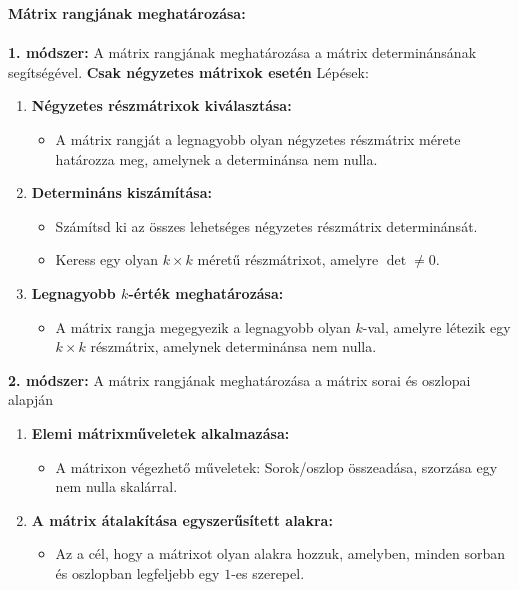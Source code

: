 \documentclass[a4paper, 12pt]{scrartcl}
\begin{document}
\begin{blueBox}
  \textbf{\large Mátrix rangjának meghatározása:}\\
  \,\\
  \textbf{1. módszer:} A mátrix rangjának meghatározása a mátrix determinánsának segítségével. \textbf{Csak négyzetes mátrixok esetén} Lépések:
  \begin{enumerate}
    \item \textbf{Négyzetes részmátrixok kiválasztása:}
          \begin{itemize}
            \item A mátrix rangját a legnagyobb olyan négyzetes részmátrix mérete határozza meg, amelynek a determinánsa nem nulla.
          \end{itemize}

    \item \textbf{Determináns kiszámítása:}
          \begin{itemize}
            \item Számítsd ki az összes lehetséges négyzetes részmátrix determinánsát.
            \item Keress egy olyan \( k \times k \) méretű részmátrixot, amelyre \( \det \neq 0 \).
          \end{itemize}

    \item \textbf{Legnagyobb \( k \)-érték meghatározása:}
          \begin{itemize}
            \item A mátrix rangja megegyezik a legnagyobb olyan \( k \)-val, amelyre létezik egy \( k \times k \) részmátrix, amelynek determinánsa nem nulla.
          \end{itemize}
  \end{enumerate}
  \textbf{2. módszer:} A mátrix rangjának meghatározása a mátrix sorai és oszlopai alapján
  \begin{enumerate}
    \item \textbf{Elemi mátrixműveletek alkalmazása:}
          \begin{itemize}
            \item A mátrixon végezhető műveletek: Sorok/oszlop összeadása, szorzása egy nem nulla skalárral.
          \end{itemize}

    \item \textbf{A mátrix átalakítása egyszerűsített alakra:}
          \begin{itemize}
            \item Az a cél, hogy a mátrixot olyan alakra hozzuk, amelyben, minden sorban és oszlopban legfeljebb egy \( 1 \)-es szerepel.
          \end{itemize}


\end{enumerate}
\end{blueBox}
\end{document}

